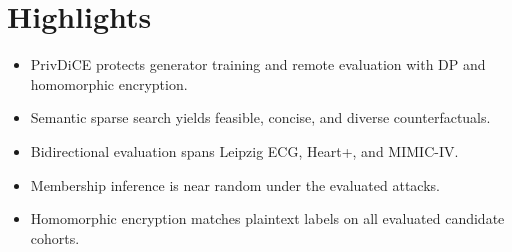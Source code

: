 \documentclass[12pt]{article}
\begin{document}
\section*{Highlights}

\begin{itemize}[leftmargin=*]

    \item PrivDiCE protects generator training and remote evaluation with DP and homomorphic encryption.

    \item Semantic sparse search yields feasible, concise, and diverse counterfactuals.

    \item Bidirectional evaluation spans Leipzig ECG, Heart+, and MIMIC-IV.

    \item Membership inference is near random under the evaluated attacks.

    \item Homomorphic encryption matches plaintext labels on all evaluated candidate cohorts.

\end{itemize}
\end{document}
